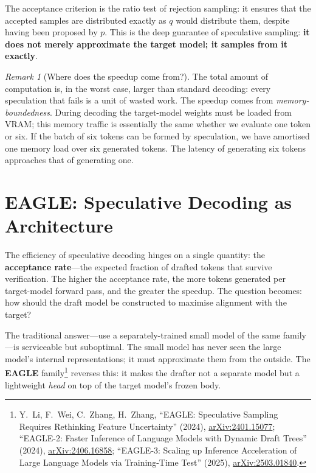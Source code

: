 \documentclass[11pt,a4paper]{article}
\theoremstyle{definition}
\theoremstyle{remark}
\newtheorem*{remark}{Remark}
\theoremstyle{plain}
\newcommand{\arxivlink}[1]{\href{https://arxiv.org/abs/#1}{arXiv:#1}}
\begin{document}
The acceptance criterion is the ratio test of rejection sampling: it
ensures that the accepted samples are distributed exactly as $q$ would
distribute them, despite having been proposed by $p$. This is the deep
guarantee of speculative sampling: \textbf{it does not merely approximate
the target model; it samples from it exactly}.

\begin{remark}[Where does the speedup come from?]
The total amount of computation is, in the worst case, larger than
standard decoding: every speculation that fails is a unit of wasted work.
The speedup comes from \emph{memory-boundedness}. During decoding the
target-model weights must be loaded from VRAM; this memory traffic is
essentially the same whether we evaluate one token or six. If the batch of
six tokens can be formed by speculation, we have amortised one memory load
over six generated tokens. The latency of generating six tokens approaches
that of generating one.
\end{remark}

\section{EAGLE: Speculative Decoding as Architecture}
\label{sec:eagle}

The efficiency of speculative decoding hinges on a single quantity: the
\textbf{acceptance rate}---the expected fraction of drafted tokens that
survive verification. The higher the acceptance rate, the more tokens
generated per target-model forward pass, and the greater the speedup. The
question becomes: how should the draft model be constructed to maximise
alignment with the target?

The traditional answer---use a separately-trained small model of the same
family---is serviceable but suboptimal. The small model has never seen the
large model's internal representations; it must approximate them from the
outside. The \textbf{EAGLE} family\footnote{Y.\ Li, F.\ Wei, C.\ Zhang,
H.\ Zhang, ``EAGLE: Speculative Sampling Requires Rethinking Feature
Uncertainty'' (2024), \arxivlink{2401.15077}; ``EAGLE-2: Faster Inference
of Language Models with Dynamic Draft Trees'' (2024),
\arxivlink{2406.16858}; ``EAGLE-3: Scaling up Inference Acceleration of
Large Language Models via Training-Time Test'' (2025),
\arxivlink{2503.01840}.} reverses this: it makes the drafter not a
separate model but a lightweight \emph{head} on top of the target model's
frozen body.
\end{document}
